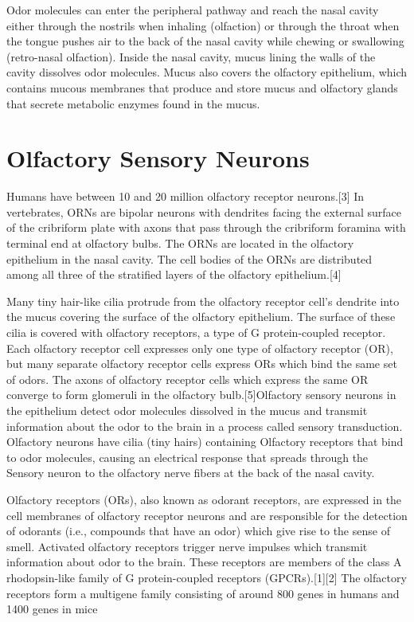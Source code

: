 Odor molecules can enter the peripheral pathway and reach the nasal cavity either through the nostrils when inhaling (olfaction) or through the throat when the tongue pushes air to the back of the nasal cavity while chewing or swallowing (retro-nasal olfaction). Inside the nasal cavity, mucus lining the walls of the cavity dissolves odor molecules. Mucus also covers the olfactory epithelium, which contains mucous membranes that produce and store mucus and olfactory glands that secrete metabolic enzymes found in the mucus.

\hypertarget{olfactory-sensory-neurons}{%
\section{Olfactory Sensory Neurons}\label{olfactory-sensory-neurons}}

Humans have between 10 and 20 million olfactory receptor neurons.{[}3{]} In vertebrates, ORNs are bipolar neurons with dendrites facing the external surface of the cribriform plate with axons that pass through the cribriform foramina with terminal end at olfactory bulbs. The ORNs are located in the olfactory epithelium in the nasal cavity. The cell bodies of the ORNs are distributed among all three of the stratified layers of the olfactory epithelium.{[}4{]}

Many tiny hair-like cilia protrude from the olfactory receptor cell's dendrite into the mucus covering the surface of the olfactory epithelium. The surface of these cilia is covered with olfactory receptors, a type of G protein-coupled receptor. Each olfactory receptor cell expresses only one type of olfactory receptor (OR), but many separate olfactory receptor cells express ORs which bind the same set of odors. The axons of olfactory receptor cells which express the same OR converge to form glomeruli in the olfactory bulb.{[}5{]}Olfactory sensory neurons in the epithelium detect odor molecules dissolved in the mucus and transmit information about the odor to the brain in a process called sensory transduction. Olfactory neurons have cilia (tiny hairs) containing Olfactory receptors that bind to odor molecules, causing an electrical response that spreads through the Sensory neuron to the olfactory nerve fibers at the back of the nasal cavity.

Olfactory receptors (ORs), also known as odorant receptors, are expressed in the cell membranes of olfactory receptor neurons and are responsible for the detection of odorants (i.e., compounds that have an odor) which give rise to the sense of smell. Activated olfactory receptors trigger nerve impulses which transmit information about odor to the brain. These receptors are members of the class A rhodopsin-like family of G protein-coupled receptors (GPCRs).{[}1{]}{[}2{]} The olfactory receptors form a multigene family consisting of around 800 genes in humans and 1400 genes in mice

